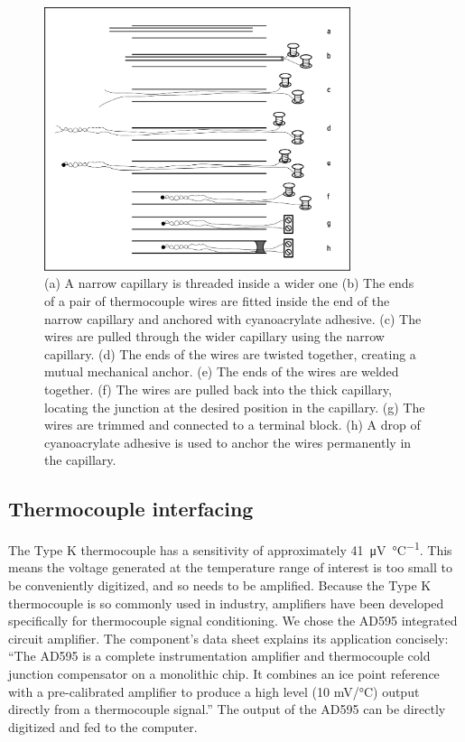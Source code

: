 \begin{figure}
	\centering
	\includegraphics[width=0.8\textwidth]{Figures/FineWireThermocouple.pdf}
	\decoRule
	
\caption[A cartoon explaining how to construct a long, thin thermocouple
probe.]{(a) A narrow capillary is threaded inside a wider one (b) The ends of a
pair of thermocouple wires are fitted inside the end of the narrow capillary and
anchored with cyanoacrylate adhesive. (c) The wires are pulled through the
wider capillary using the narrow capillary. (d) The ends of the wires are twisted
together, creating a mutual mechanical anchor.
(e) The ends of the wires are welded together. (f) The wires are pulled back
into the thick capillary, locating the junction at the desired position in the
capillary. (g) The wires are trimmed and connected to a terminal block. (h) A
drop of cyanoacrylate adhesive is used to anchor the wires permanently in the
capillary. }
	
	\label{fig:FineWireThermocouple}
\end{figure}

\subsection{Thermocouple interfacing}

The Type K thermocouple has a sensitivity of approximately
\SI{41}{\micro\volt\per\celsius}. This means the voltage generated at the
temperature range of interest is too small to be conveniently digitized, and so
needs to be amplified. Because the Type K thermocouple is so commonly used in
industry, amplifiers have been developed specifically for thermocouple signal
conditioning. We chose the AD595 integrated circuit amplifier. The component's
data sheet explains its application concisely: ``The AD595 is a complete
instrumentation amplifier and thermocouple cold junction compensator on a
monolithic chip. It combines an ice point reference with a pre-calibrated
amplifier to produce a high level (10 mV/°C) output directly from a thermocouple
signal.'' \autocite{AD595} The output of the AD595 can be directly digitized and
fed to the computer.

